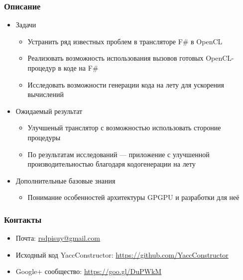 \documentclass{beamer}
\begin{document}
\begin{frame}[fragile]
\transwipe[direction=90]
\frametitle{Описание}
\begin{itemize}
\item Задачи
\begin{itemize}
  \item Устранить ряд известных проблем в трансляторе F\# в OpenCL
  \item Реализовать возможность использования вызовов готовых OpenCL-процедур в коде на F\#
  \item Исследовать возможности генерации кода на лету для ускорения вычислений
\end{itemize}
\item Ожидаемый результат
\begin{itemize}
\item Улучшеный транслятор с возможностью использовать стороние процедуры
\item По результатам исследований --- приложение с улучшенной производительностью благодаря 
кодогенерации на лету
\end{itemize}
\item Дополнительные базовые знания
\begin{itemize}
\item Понимание особенностей архитектуры GPGPU и разработки для неё
\end{itemize}
\end{itemize}
\end{frame}
            
\begin{frame}
\transwipe[direction=90]
\frametitle{Контакты}
\begin{itemize}
  \item Почта: \url{rsdpisuy@gmail.com}
  \item Исходный код YaccConstructor: \url{https://github.com/YaccConstructor}
  \item Google+ сообщество: \url{https://goo.gl/DuPWkM}
\end{itemize}
\end{frame}
\end{document}
